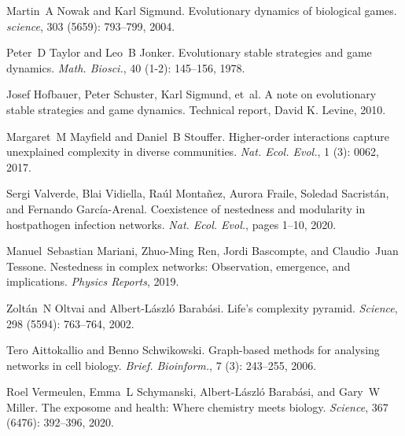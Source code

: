 Martin~A Nowak and Karl Sigmund.
\newblock Evolutionary dynamics of biological games.
\newblock \emph{science}, 303 (5659): 793--799, 2004.

Peter~D Taylor and Leo~B Jonker.
\newblock Evolutionary stable strategies and game dynamics.
\newblock \emph{Math. Biosci.}, 40 (1-2): 145--156, 1978.

Josef Hofbauer, Peter Schuster, Karl Sigmund, et~al.
\newblock A note on evolutionary stable strategies and game dynamics.
\newblock Technical report, {David K. Levine}, 2010.

Margaret~M Mayfield and Daniel~B Stouffer.
\newblock Higher-order interactions capture unexplained complexity in diverse
communities.
\newblock \emph{Nat. Ecol. Evol.}, 1 (3): 0062, 2017.

Sergi Valverde, Blai Vidiella, Ra{\'u}l Monta{\~n}ez, Aurora Fraile, Soledad
Sacrist{\'a}n, and Fernando {Garc{\'i}a-Arenal}.
\newblock Coexistence of nestedness and modularity in host\textendash{}pathogen
infection networks.
\newblock \emph{Nat. Ecol. Evol.}, pages 1--10, 2020.

Manuel~Sebastian Mariani, Zhuo-Ming Ren, Jordi Bascompte, and Claudio~Juan
Tessone.
\newblock Nestedness in complex networks: Observation, emergence, and
implications.
\newblock \emph{Physics Reports}, 2019.

Zolt{\'a}n~N Oltvai and Albert-L{\'a}szl{\'o} Barab{\'a}si.
\newblock Life's complexity pyramid.
\newblock \emph{Science}, 298 (5594): 763--764, 2002.

Tero Aittokallio and Benno Schwikowski.
\newblock Graph-based methods for analysing networks in cell biology.
\newblock \emph{Brief. Bioinform.}, 7 (3): 243--255, 2006.

Roel Vermeulen, Emma~L Schymanski, Albert-L{\'a}szl{\'o} Barab{\'a}si, and
Gary~W Miller.
\newblock The exposome and health: {{Where}} chemistry meets biology.
\newblock \emph{Science}, 367 (6476): 392--396, 2020.

